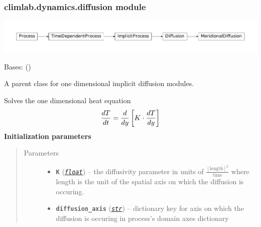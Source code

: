 \documentclass[a4paper,10pt,english]{sphinxmanual}
\begin{document}
\subsubsection{climlab.dynamics.diffusion module}
\label{api/climlab.dynamics:climlab-dynamics-diffusion-module}
\includegraphics{inheritance-804892074707de77374c9484dbf91ce4dddd70eb.pdf}
\label{api/climlab.dynamics:module-climlab.dynamics.diffusion}

\begin{fulllineitems}
\label{api/climlab.dynamics:climlab.dynamics.diffusion.Diffusion}
Bases: {\hyperref[api/climlab.process:climlab.process.implicit.ImplicitProcess]{\emph{}}} ()

A parent class for one dimensional implicit diffusion modules.

Solves the one dimensional heat equation
\begin{gather}
\begin{split}\frac{dT}{dt} = \frac{d}{dy} \left[ K \cdot \frac{dT}{dy} \right]\end{split}\notag
\end{gather}
\textbf{Initialization parameters}
\begin{quote}\begin{description}
\item[{Parameters}] \leavevmode\begin{itemize}
\item {} 
\textbf{\texttt{K}} (\href{http://docs.python.org/2.7/library/functions.html\#float}{\emph{\texttt{float}}}) -- the diffusivity parameter in units of 
\(\frac{[\textrm{length}]^2}{\textrm{time}}\)
where length is the unit of the spatial axis
on which the diffusion is occuring.

\item {} 
\textbf{\texttt{diffusion\_axis}} (\href{http://docs.python.org/2.7/library/functions.html\#str}{\emph{\texttt{str}}}) -- dictionary key for axis on which the 
diffusion is occuring in process's domain
axes dictionary


\end{itemize}
\end{description}
\end{quote}
\end{fulllineitems}
\end{document}
